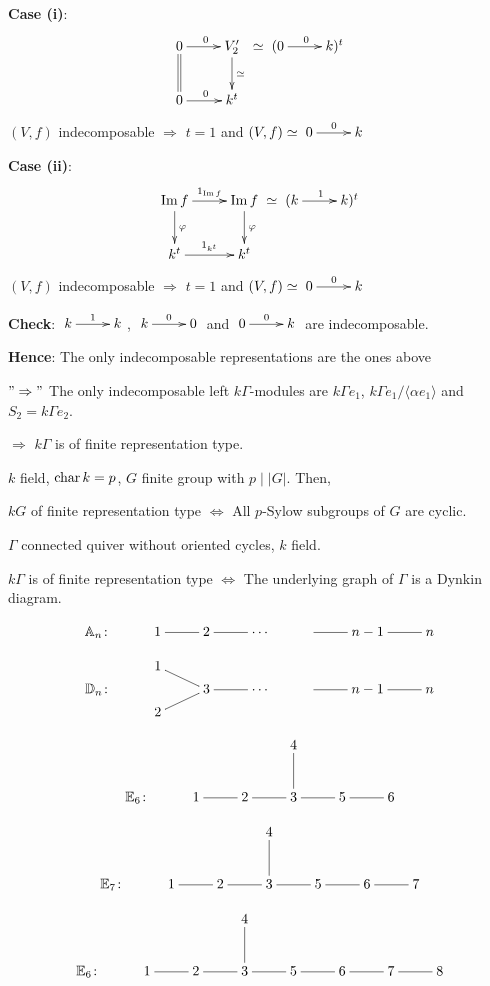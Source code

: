 \begin{exam}
\textbf{Case (i)}:
\[\xymatrix{
0 \ar[r]^0\ar@{=}[d] & V'_2\ar[d]^\simeq\\
0 \ar[r]^0 & k^t} \simeq \xymatrix{(0\ar[r]^0 & k)^t}\]
$(V,f)$ indecomposable $\Rightarrow$ $t = 1$ and $(V,f)\simeq
\xymatrix{0\ar[r]^0 & k}$ 

\textbf{Case (ii)}: 
\[\xymatrix{
\Im f \ar[r]^{1_{\Im f}}\ar[d]^\varphi & \Im f\ar[d]^\varphi\\
k^t \ar[r]^{1_{k^t}} & k^t} \simeq \xymatrix{(k\ar[r]^1 & k)^t}\]
$(V,f)$ indecomposable $\Rightarrow$ $t = 1$ and $(V,f)\simeq
\xymatrix{0\ar[r]^0 & k}$ 

\textbf{Check}: $\xymatrix{k \ar[r]^1 & k}$, $\xymatrix{k\ar[r]^0 & 0}$ and
$\xymatrix{0 \ar[r]^0 & k}$ are indecomposable. 

\textbf{Hence}: The only indecomposable representations are the ones
above  

$"\Rightarrow"$ The only indecomposable left $k\Gamma$-modules
are $k\Gamma e_1$, $k\Gamma e_1/\langle \alpha e_1\rangle$ and $S_2 =
k\Gamma e_2$. 

$\Rightarrow$ $k\Gamma$ is of finite representation type. 
\end{exam}

\begin{thm}\label{thm:4}
$k$ field, $\operatorname{char}\nolimits k = p$, $G$ finite group with $p\mid |G|$. Then,

$kG$ of finite representation type $\Leftrightarrow$ All $p$-Sylow
subgroups of $G$ are cyclic.
\end{thm}

\begin{thm}\label{thm:5}
$\Gamma$ connected quiver without oriented cycles, $k$  field.

$k\Gamma$ is of finite representation type $\Leftrightarrow$ The
underlying graph of $\Gamma$ is a Dynkin diagram.

\[\xymatrix{\mathbb{A}_n\colon & 1\ar@{-}[r] & 2\ar@{-}[r] & \cdots &
    \ar@{-}[r] & n-1 \ar@{-}[r] & n}\]

\[\xymatrix@R=3pt{
& 1\ar@{-}[dr] &  & & & & \\
\mathbb{D}_n\colon &  & 3\ar@{-}[r] & \cdots &  \ar@{-}[r] & n-1 \ar@{-}[r] & n\\
& 2\ar@{-}[ur] & & & & & }\]

\[\xymatrix{
& & & 4\ar@{-}[d] & & \\
\mathbb{E}_6\colon & 1\ar@{-}[r] & 2\ar@{-}[r] & 3\ar@{-}[r] &
   5 \ar@{-}[r] & 6}\]

\[\xymatrix{
& & & 4\ar@{-}[d] & & & \\
\mathbb{E}_7\colon & 1\ar@{-}[r] & 2\ar@{-}[r] & 3\ar@{-}[r] &
   5 \ar@{-}[r] & 6 \ar@{-}[r] & 7}\]

\[\xymatrix{
& & & 4\ar@{-}[d] & & & &\\
\mathbb{E}_6\colon & 1\ar@{-}[r] & 2\ar@{-}[r] & 3\ar@{-}[r] &
   5 \ar@{-}[r] & 6 \ar@{-}[r] & 7 \ar@{-}[r] & 8}\]
\end{thm}

